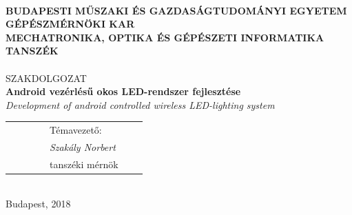 \documentclass[12pt,a4paper]{article}
\begin{document}
\thispagestyle{empty}
\begin{titlepage} %
\centering
{}\\[1ex]
{\bf BUDAPESTI MŰSZAKI ÉS GAZDASÁGTUDOMÁNYI EGYETEM}\\
{\bf GÉPÉSZMÉRNÖKI KAR}\\
{\bf MECHATRONIKA, OPTIKA ÉS GÉPÉSZETI INFORMATIKA TANSZÉK}\\[3cm]

{\LARGE \scshape \myname}\\[2ex]
{\LARGE SZAKDOLGOZAT}\\[2ex]
{\LARGE \bf Android vezérlésű okos LED-rendszer fejlesztése}\\[2ex]
{\itshape Development of android controlled wireless LED-lighting system}\\[5cm]

\begin{tabularx}{\textwidth}{XXXX}
~~~~~~ & Témavezető: \\
\hspace{0.75cm} \itshape ~~~~~~ & \hspace{0.75cm} \itshape Szakály Norbert \\
\hspace{0.75cm} ~~~~~~ & \hspace{0.75cm} tanszéki mérnök \\
\end{tabularx}\\[5.5cm]

{\Large Budapest, 2018}
\end{titlepage}
\newpage

\setcounter{page}{4}

\newpage

\end{document}
